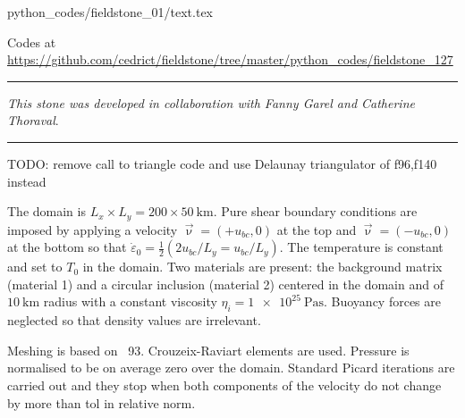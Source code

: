 \begin{flushright} {\tiny {\color{gray} python\_codes/fieldstone\_01/text.tex}} \end{flushright}



\begin{center}

Codes at \url{https://github.com/cedrict/fieldstone/tree/master/python_codes/fieldstone_127}
\end{center}

\par\noindent\rule{\textwidth}{0.4pt}

{\sl This stone was developed in collaboration with Fanny Garel and Catherine Thoraval}. 

\par\noindent\rule{\textwidth}{0.4pt}


TODO: remove call to triangle code and use Delaunay triangulator of f96,f140 instead


The domain is $L_x \times L_y=200\times 50~\si{\km}$. Pure shear boundary conditions are imposed by 
applying a velocity $\vec\upnu=(+u_{bc},0)$ at the top and $\vec\upnu=(-u_{bc},0)$ at the bottom so 
that $\dot\varepsilon_{0}=\frac12 (2u_{bc}/L_y=u_{bc}/L_y)$.
The temperature is constant and set to $T_0$ in the domain.
Two materials are present: the background matrix (material 1) and a circular inclusion (material 2)
centered in the domain and of $10~\si{\km}$ radius with a constant 
viscosity $\eta_i=\SI{1e25}{\pascal\second}$.
Buoyancy forces are neglected so that density values are irrelevant.

Meshing is based on \stone~93. Crouzeix-Raviart elements are used. Pressure is normalised to be
on average zero over the domain.
Standard Picard iterations are carried out and they stop when both components 
of the velocity do not change by more than {\python tol} in relative norm. 


